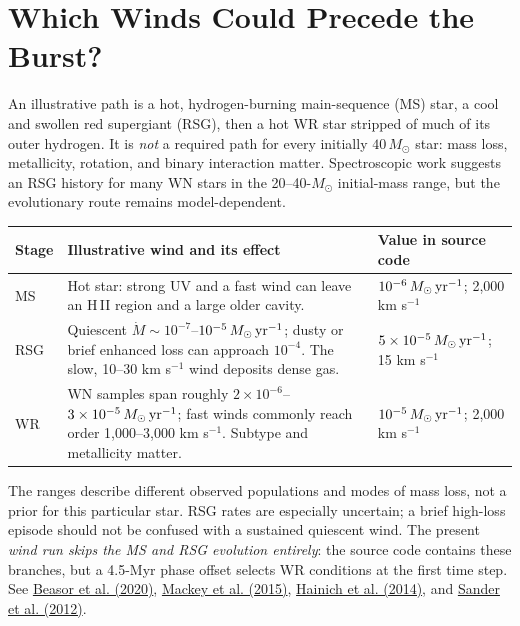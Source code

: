 \documentclass[10pt,letterpaper]{article}
\begin{document}
\section{Which Winds Could Precede the Burst?}
An illustrative path is a hot, hydrogen-burning main-sequence (MS) star, a cool and swollen red supergiant (RSG), then a hot WR star stripped of much of its outer hydrogen. It is \emph{not} a required path for every initially $40\,M_\odot$ star: mass loss, metallicity, rotation, and binary interaction matter. Spectroscopic work suggests an RSG history for many WN stars in the 20--40-$M_\odot$ initial-mass range, but the evolutionary route remains model-dependent.

\begingroup\small\renewcommand{\arraystretch}{1.08}\setlength{\tabcolsep}{5pt}
\begin{tabularx}{\textwidth}{@{}p{}>{\raggedright\arraybackslash}X p{}@{}}
\toprule
Stage & Illustrative wind and its effect & Value in source code \\
\midrule
MS & Hot star: strong UV and a fast wind can leave an H\,II region and a large older cavity. & $10^{-6}\,M_\odot\,{\rm yr}^{-1}$; 2,000 km s$^{-1}$ \\
RSG & Quiescent $\dot M\sim10^{-7}$--$10^{-5}\,M_\odot\,{\rm yr}^{-1}$; dusty or brief enhanced loss can approach $10^{-4}$. The slow, 10--30 km s$^{-1}$ wind deposits dense gas. & $5\times10^{-5}\,M_\odot\,{\rm yr}^{-1}$; 15 km s$^{-1}$ \\
WR & WN samples span roughly $2\times10^{-6}$--$3\times10^{-5}\,M_\odot\,{\rm yr}^{-1}$; fast winds commonly reach order 1,000--3,000 km s$^{-1}$. Subtype and metallicity matter. & $10^{-5}\,M_\odot\,{\rm yr}^{-1}$; 2,000 km s$^{-1}$ \\
\bottomrule
\end{tabularx}
\endgroup

The ranges describe different observed populations and modes of mass loss, not a prior for this particular star. RSG rates are especially uncertain; a brief high-loss episode should not be confused with a sustained quiescent wind. The present \emph{wind run skips the MS and RSG evolution entirely}: the source code contains these branches, but a 4.5-Myr phase offset selects WR conditions at the first time step. See \href{https://arxiv.org/abs/2001.07222}{Beasor et al. (2020)}, \href{https://arxiv.org/abs/1508.07003}{Mackey et al. (2015)}, \href{https://arxiv.org/abs/1401.5474}{Hainich et al. (2014)}, and \href{https://arxiv.org/abs/1201.6354}{Sander et al. (2012)}.
\end{document}
